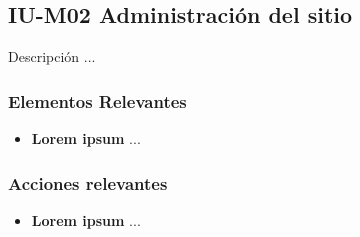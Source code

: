 
\subsection{IU-M02 Administración del sitio}

 Descripción ...


\subsubsection{Elementos Relevantes}

    \begin{itemize}
    \item {\bf Lorem ipsum} ...
    \end{itemize}

\subsubsection{Acciones relevantes}

    \begin{itemize}
    \item {\bf Lorem ipsum} ...
    \end{itemize}

